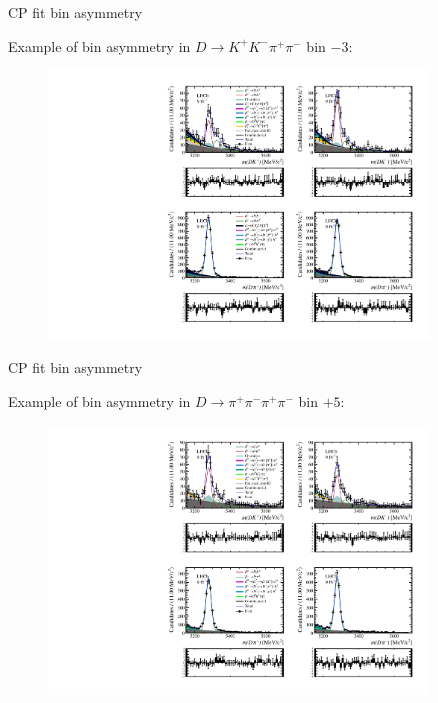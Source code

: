 \documentclass[xcolor={dvipsnames}]{beamer}
\begin{document}
\begin{frame}{CP fit bin asymmetry}
  \begin{center}
    {\large Example of bin asymmetry in $D\to K^+K^-\pi^+\pi^-$ bin $-3$:}
  \end{center}
  \begin{figure}
    \centering
    \includegraphics[width = 0.9\textwidth,trim={0 10cm 0 0},clip=true]{Plots/d2kkpipi_fiveL_binm3.pdf}
  \end{figure}
\end{frame}

\begin{frame}{CP fit bin asymmetry}
  \begin{center}
    {\large Example of bin asymmetry in $D\to\pi^+\pi^-\pi^+\pi^-$ bin $+5$:}
  \end{center}
  \begin{figure}
    \centering
    \includegraphics[width = 0.9\textwidth,trim={0 10cm 0 0},clip=true]{Plots/d2pipipipi_fiveL_binp5.pdf}
  \end{figure}
\end{frame}
\end{document}
